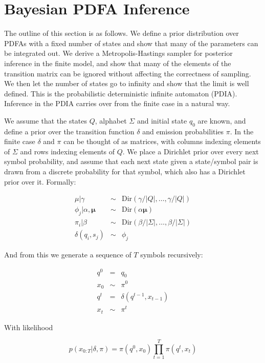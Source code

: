 \section{Bayesian PDFA Inference}

The outline of this section is as follows.  We define a prior distribution over PDFAs with a fixed number of states and show that many of the parameters can be integrated out.  We derive a Metropolis-Hastings sampler for posterior inference in the finite model, and show that many of the elements of the transition matrix can be ignored without affecting the correctness of sampling.  We then let the number of states go to infinity and show that the limit is well defined.  This is the probabilistic deterministic infinite automaton (PDIA).  Inference in the PDIA carries over from the finite case in a natural way.

We assume that the states $Q$, alphabet $\Sigma$ and initial state $q_0$ are known, and define a prior over the transition function $\delta$ and emission probabilities $\pi$.  In the finite case $\delta$ and $\pi$ can be thought of as matrices, with columns indexing elements of $\Sigma$ and rows indexing elements of $Q$.  We place a Dirichlet prior over every next symbol probability, and assume that each next state given a state/symbol pair is drawn from a discrete probability for that symbol, which also has a Dirichlet prior over it.  Formally:

\begin{eqnarray}
\mu|\gamma & \sim & \mathrm{Dir}\left(\gamma/|Q|,\ldots,\gamma/|Q|\right) \\
\phi_{j}|\alpha,\mathbf{\mu}  & \sim & \mathrm{Dir}(\alpha\mathbf{\mu}) \\
\pi_{i}|\beta & \sim & \mathrm{Dir}(\beta/|\Sigma|,\ldots,\beta/|\Sigma|)\\
\delta(q_i,s_j) & \sim & \phi_{j}
\end{eqnarray}

And from this we generate a sequence of $T$ symbols recursively:

\begin{eqnarray*}
q^0 & = & q_0 \\
x_0 & \sim & \pi^0 \\
q^t & = & \delta(q^{t-1},x_{t-1}) \\
x_t & \sim & \pi^t
\end{eqnarray*}

With likelihood

\[ p(x_{0:T}|\delta,\pi) = \pi(q^0,x_0)\prod_{t=1}^T \pi(q^t,x_t) \]

